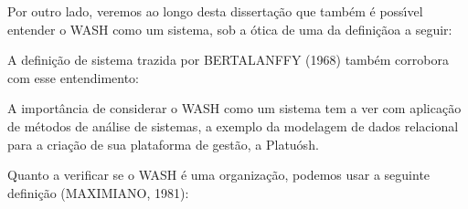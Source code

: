 \documentclass[
12pt,		%
openright,	%
twoside,  %
a4paper,			%
chapter=TITLE,		%
english,			%
french,				%
spanish,			%
brazil				%
]{USPSC-classe/USPSC}
\begin{document}
Por outro lado, veremos ao longo desta disserta\c{c}\~ao que tamb\'em \'e poss\'{\i}vel entender o WASH como um sistema, sob a \'otica de uma da defini\c{c}\~aoa a seguir:


















\noindent\begin{center}\mbox{\centering{}}\end{center}


A defini\c{c}\~ao de sistema trazida por BERTALANFFY (1968) tamb\'em corrobora com esse entendimento:


















\noindent\begin{center}\mbox{\centering{}}\end{center}


A import\^ancia de considerar o WASH como um sistema tem a ver com aplica\c{c}\~ao de m\'etodos de an\'alise de sistemas, a exemplo da modelagem de dados relacional para a cria\c{c}\~ao de sua plataforma de gest\~ao, a \textquotedbl Platu\'osh\textquotedbl .

















Quanto a verificar se o WASH \'e uma organiza\c{c}\~ao, podemos usar a seguinte defini\c{c}\~ao  (MAXIMIANO, 1981):
\end{document}
